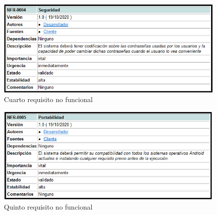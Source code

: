 \begin{figure}[H]
    \centering
    \includegraphics[width=1\linewidth]{fig/Requisitos no funcionales/rnf4.png}
    \caption{Cuarto requisito no funcional}
    \label{fig:rnf4}
\end{figure}
\begin{figure}[H]
    \centering
    \includegraphics[width=1\linewidth]{fig/Requisitos no funcionales/rnf5.png}
    \caption{Quinto requisito no funcional}
    \label{fig:rnf5}
\end{figure}

\newpage